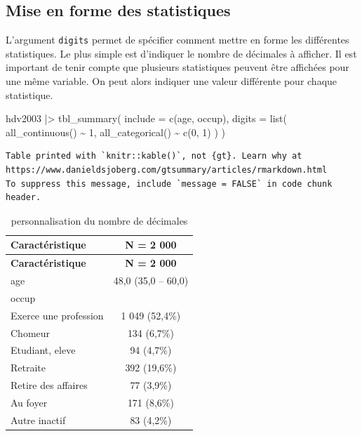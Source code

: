 \documentclass[
  letterpaper,
  DIV=11,
  numbers=noendperiod,
  oneside]{scrreprt}
\newenvironment{Shaded}{\begin{snugshade}}{\end{snugshade}}
\newcommand{\AttributeTok}[1]{\textcolor[rgb]{0.40,0.45,0.13}{#1}}
\newcommand{\DecValTok}[1]{\textcolor[rgb]{0.68,0.00,0.00}{#1}}
\newcommand{\FunctionTok}[1]{\textcolor[rgb]{0.28,0.35,0.67}{#1}}
\newcommand{\NormalTok}[1]{\textcolor[rgb]{0.00,0.23,0.31}{#1}}
\newcommand{\SpecialCharTok}[1]{\textcolor[rgb]{0.37,0.37,0.37}{#1}}
\begin{document}
\hypertarget{mise-en-forme-des-statistiques}{%
\subsection{Mise en forme des
statistiques}\label{mise-en-forme-des-statistiques}}

L'argument \texttt{digits} permet de spécifier comment mettre en forme
les différentes statistiques. Le plus simple est d'indiquer le nombre de
décimales à afficher. Il est important de tenir compte que plusieurs
statistiques peuvent être affichées pour une même variable. On peut
alors indiquer une valeur différente pour chaque statistique.

\begin{Shaded}
\begin{Highlighting}[]
\NormalTok{hdv2003 }\SpecialCharTok{|\textgreater{}}
  \FunctionTok{tbl\_summary}\NormalTok{(}
    \AttributeTok{include =} \FunctionTok{c}\NormalTok{(age, occup),}
    \AttributeTok{digits =} \FunctionTok{list}\NormalTok{(}
      \FunctionTok{all\_continuous}\NormalTok{() }\SpecialCharTok{\textasciitilde{}} \DecValTok{1}\NormalTok{,}
      \FunctionTok{all\_categorical}\NormalTok{() }\SpecialCharTok{\textasciitilde{}} \FunctionTok{c}\NormalTok{(}\DecValTok{0}\NormalTok{, }\DecValTok{1}\NormalTok{)}
\NormalTok{    )}
\NormalTok{  )}
\end{Highlighting}
\end{Shaded}

\begin{verbatim}
Table printed with `knitr::kable()`, not {gt}. Learn why at
https://www.danieldsjoberg.com/gtsummary/articles/rmarkdown.html
To suppress this message, include `message = FALSE` in code chunk header.
\end{verbatim}

\hypertarget{tbl-digits}{}
\begin{longtable}[]{@{}lc@{}}
\caption{\label{tbl-digits}personnalisation du nombre de
décimales}\tabularnewline
\toprule()
\textbf{Caractéristique} & \textbf{N = 2 000} \\
\midrule()
\endfirsthead
\toprule()
\textbf{Caractéristique} & \textbf{N = 2 000} \\
\midrule()
\endhead
age & 48,0 (35,0 -- 60,0) \\
occup & \\
Exerce une profession & 1 049 (52,4\%) \\
Chomeur & 134 (6,7\%) \\
Etudiant, eleve & 94 (4,7\%) \\
Retraite & 392 (19,6\%) \\
Retire des affaires & 77 (3,9\%) \\
Au foyer & 171 (8,6\%) \\
Autre inactif & 83 (4,2\%) \\
\bottomrule()
\end{longtable}
\end{document}
